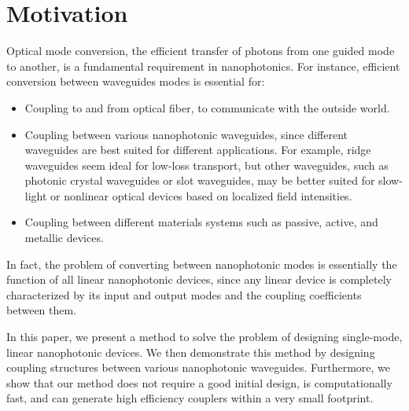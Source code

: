 \documentclass[letterpaper,10pt]{article}
\begin{document}
\section{Motivation}

Optical mode conversion, 
    the efficient transfer of photons from one guided mode to another,
    is a fundamental requirement in nanophotonics.
For instance, efficient conversion between waveguides modes
    is essential for:
    \begin{itemize}
        \item Coupling to and from optical fiber\cite{fibergrating}, 
        to communicate with the outside world.
    \item Coupling between various nanophotonic waveguides, 
        since different waveguides are best suited for different applications.
        For example, ridge waveguides seem ideal for 
            low-loss transport\cite{ridge},
            but other waveguides, 
            such as photonic crystal waveguides or slot waveguides,
            may be better suited for slow-light\cite{pcslow} 
            or nonlinear optical devices based on 
            localized field intensities\cite{slotfocus}.
    \item Coupling between different materials systems such as
       passive, active\cite{active}, and metallic\cite{metallic} devices. 
    \end{itemize}
In fact, the problem of converting between nanophotonic modes is essentially
    the function of all linear nanophotonic devices, since
    any linear device is completely characterized by its input and output modes
    and the coupling coefficients between them.

In this paper, we present a method to solve the problem 
    of designing single-mode, linear nanophotonic devices.
We then demonstrate this method by designing coupling structures 
    between various nanophotonic waveguides.
Furthermore, we show that our method 
     does not require a good initial design,
     is computationally fast,
     and can generate high efficiency couplers within a very small footprint. 
% 
% 
% 
\end{document}
